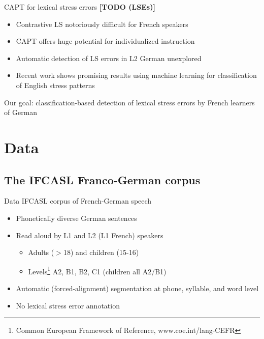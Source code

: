\documentclass[xcolor={dvipsnames}]{beamer}
\newcommand{\TODO}[1]{{\color{red}\textbf{[TODO #1]}}}
\begin{document}
\begin{frame}{CAPT for lexical stress errors \TODO{(LSEs)}}
\begin{itemize}
\item{Contrastive LS notoriously difficult for French speakers%
}
\item{CAPT offers huge potential for individualized instruction}
\vfill
\item{Automatic detection of LS errors in L2 German unexplored}
\item{Recent work shows promising results using machine learning for classification of English stress patterns
}
\end{itemize}
\vfill
Our goal: classification-based detection of lexical stress errors by French learners of German
\end{frame}


\section{Data}
\subsection{The IFCASL Franco-German corpus}
\begin{frame}{Data}
IFCASL corpus of French-German speech
		\begin{itemize}
			\item{Phonetically diverse German sentences}
			\item{Read aloud by L1 and L2 (L1 French) speakers %
				\begin{itemize}
				\item Adults ($>$18) and children (15-16)
				\item Levels\footnote{Common European Framework of Reference, www.coe.int/lang-CEFR} A2, B1, B2, C1 (children all A2/B1)
				\end{itemize}
			}
			\item{Automatic (forced-alignment) segmentation at phone, syllable, and word level}
			\item{No lexical stress error annotation}
		\end{itemize}
		
\end{frame}
\end{document}
